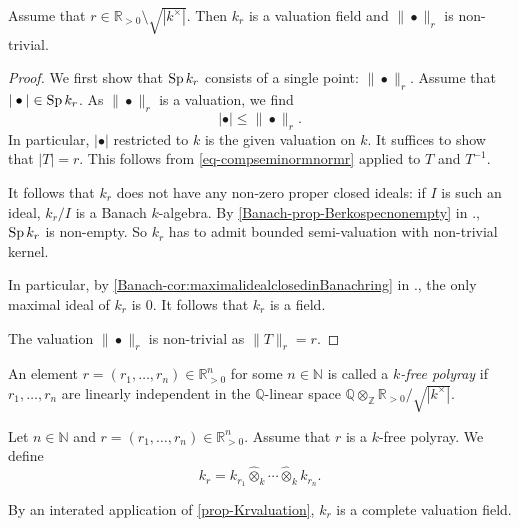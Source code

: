 \begin{proposition}\label{prop-Krvaluation}
    Assume that $r\in \mathbb{R}_{>0}\setminus \sqrt{|k^{\times}|}$. Then $k_r$ is a valuation field and $\|\bullet\|_r$ is non-trivial.
\end{proposition}
\begin{proof}
    We first show that $\operatorname{Sp} k_r$ consists of a single point: $\|\bullet\|_r$. Assume that $|\bullet|\in \operatorname{Sp} k_r$. As $\|\bullet\|_r$ is a valuation, we find 
    \begin{equation}\label{eq-compseminormnormr}
      |\bullet|\leq \|\bullet\|_r.  
    \end{equation}
    In particular, $|\bullet|$ restricted to $k$ is the given valuation on $k$. It suffices to show that $|T|=r$. This follows from \eqref{eq-compseminormnormr} applied to $T$ and $T^{-1}$.

    It follows that $k_r$ does not have any non-zero proper closed ideals: if $I$ is such an ideal, $k_r/I$ is a Banach $k$-algebra. By \cref{Banach-prop-Berkospecnonempty} in ., $\operatorname{Sp} k_r$ is non-empty. So $k_r$ has to admit bounded semi-valuation with non-trivial kernel.

    In particular, by \cref{Banach-cor:maximalidealclosedinBanachring} in ., the only maximal ideal of $k_r$ is $0$. It follows that $k_r$ is a field.

    The valuation $\|\bullet\|_r$ is non-trivial as $\|T\|_r=r$.
\end{proof}

\begin{definition}\label{def-kfreekr}
    An element $r=(r_1,\ldots,r_n)\in \mathbb{R}^n_{>0}$ for some $n\in \mathbb{N}$ is called a \emph{$k$-free polyray} if $r_1,\ldots,r_n$ are linearly independent in the $\mathbb{Q}$-linear space $\mathbb{Q}\otimes_{\mathbb{Z}}\mathbb{R}_{>0}/\sqrt{|k^{\times}|}$.

    Let $n\in \mathbb{N}$ and $r=(r_1,\ldots,r_n)\in \mathbb{R}^n_{>0}$. Assume that $r$ is a $k$-free polyray. We define 
    \[
        k_r=k_{r_1}\hat{\otimes}_k \cdots \hat{\otimes}_k k_{r_n}.  
    \]
\end{definition}
By an interated application of \cref{prop-Krvaluation}, $k_r$ is a complete valuation field.



